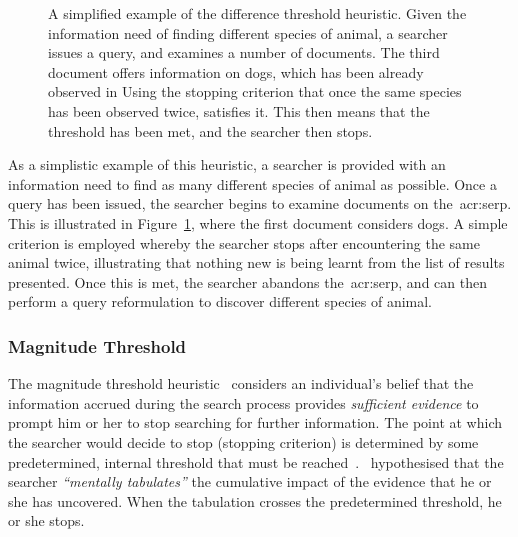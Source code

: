 \begin{figure}[t!]
    \centering
    \caption[Difference threshold heuristic]{A simplified example of the difference threshold heuristic. Given the information need of finding different species of animal, a searcher issues a query, and examines a number of documents. The third document offers information on dogs, which has been already observed in  Using the stopping criterion that once the same species has been observed twice,  satisfies it. This then means that the threshold has been met, and the searcher then stops.}
    \label{fig:difference_heuristic}
\end{figure}

As a simplistic example of this heuristic, a searcher is provided with an information need to find as many different species of animal as possible. Once a query has been issued, the searcher begins to examine documents on the~\gls{acr:serp}. This is illustrated in Figure~\ref{fig:difference_heuristic}, where the first document considers dogs. A simple criterion is employed whereby the searcher stops after encountering the same animal twice, illustrating that nothing new is being learnt from the list of results presented. Once this is met, the searcher abandons the~\gls{acr:serp}, and can then perform a query reformulation to discover different species of animal.

\subsubsection{Magnitude Threshold}\label{sec:stopping_background:heuristics:magnitude}
The magnitude threshold heuristic~\citep{nickles1995judgment} considers an individual's belief that the information accrued during the search process provides \emph{sufficient evidence} to prompt him or her to stop searching for further information. The point at which the searcher would decide to stop (stopping criterion) is determined by some predetermined, internal threshold that must be reached~\citep{wald1948sequential_analysis, nickles1995judgment}.~\cite{gettys1979hypothesis} hypothesised that the searcher \emph{``mentally tabulates''} the cumulative impact of the evidence that he or she has uncovered. When the tabulation crosses the predetermined threshold, he or she stops.

